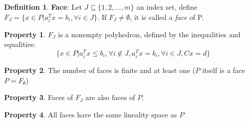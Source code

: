 \documentclass[10pt]{article}
\def\em{\emptyset}
\theoremstyle{definition}
\newtheorem{defn}{Definition}[section]
\newtheorem{pty}{Property}[section]
\begin{document}
\begin{defn} \textbf{Face}:
	Let $J \subseteq \{1,2,...,m\}$ an index set, define $F_{J} = \{x \in P | a_{i}^Tx = b_{i}, \forall i \in J\}$.
	If $F_{J} \neq \em$, it is called a \textit{face} of P.
\end{defn}

\begin{pty}
	$F_J$ is a nonempty polyhedron, defined by the inequalities and equalities:
	\begin{equation*}
		\{x \in P | a_i^Tx \le b_i, \forall i \not\in J, a_i^Tx = b_i, \forall i \in J, Cx =d \}
	\end{equation*}
\end{pty}

\begin{pty}
	The number of faces is finite and at least one ($P$ itself is a face $P = F_{\em}$)
\end{pty}

\begin{pty}
	Faces of $F_J$ are also faces of $P$.
\end{pty}

\begin{pty}
	All faces have the same lineality space as $P$
\end{pty}
\end{document}
